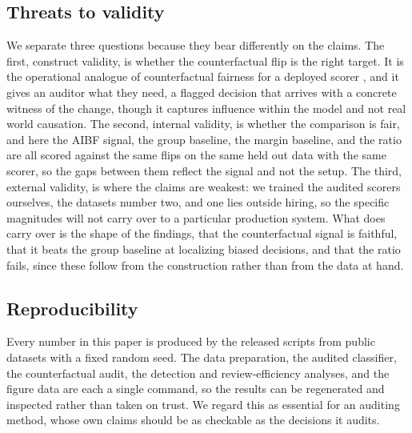 \documentclass[conference]{IEEEtran}
\begin{document}
\subsection{Threats to validity}
We separate three questions because they bear differently on the claims. The first,
construct validity, is whether the counterfactual flip is the right target. It is the
operational analogue of counterfactual fairness for a deployed scorer \cite{kusner},
and it gives an auditor what they need, a flagged decision that arrives with a concrete
witness of the change, though it captures influence within the model and not real world
causation. The second, internal validity, is whether the comparison is fair, and here
the AIBF signal, the group baseline, the margin baseline, and the ratio are all scored
against the same flips on the same held out data with the same scorer, so the gaps
between them reflect the signal and not the setup. The third, external validity, is
where the claims are weakest: we trained the audited scorers ourselves, the datasets
number two, and one lies outside hiring, so the specific magnitudes will not carry over
to a particular production system. What does carry over is the shape of the findings,
that the counterfactual signal is faithful, that it beats the group baseline at
localizing biased decisions, and that the ratio fails, since these follow from the
construction rather than from the data at hand.

\subsection{Reproducibility}
Every number in this paper is produced by the released scripts from public datasets
with a fixed random seed. The data preparation, the audited classifier, the
counterfactual audit, the detection and review-efficiency analyses, and the figure
data are each a single command, so the results can be regenerated and inspected rather
than taken on trust. We regard this as essential for an auditing method, whose own
claims should be as checkable as the decisions it audits.
\end{document}
